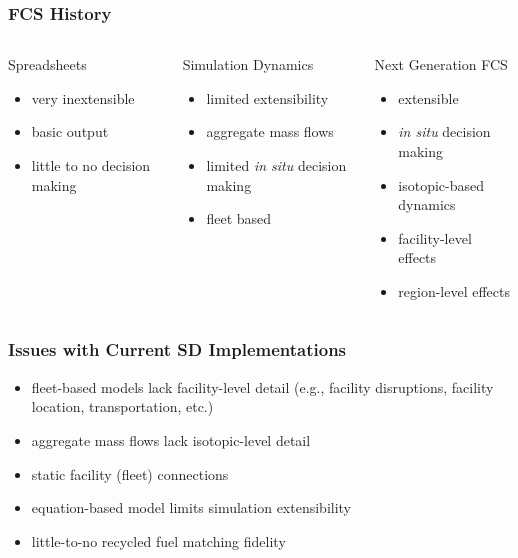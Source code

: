 
\begin{frame}[ctb!]
  \frametitle{FCS History}

  \begin{columns}[t]

    \begin{block}{Spreadsheets}
      \begin{itemize}
        \item very inextensible
        \item basic output
        \item little to no decision making
      \end{itemize}
    \end{block}

    \pause

    \begin{block}{Simulation Dynamics}
      \begin{itemize}
        \item limited extensibility
        \item aggregate mass flows
        \item limited \textit{in situ} decision making
        \item fleet based
      \end{itemize}
    \end{block}

    \pause

    \begin{block}{Next Generation FCS}
      \begin{itemize}
        \item extensible
        \item \textit{in situ} decision making
        \item isotopic-based dynamics
        \item facility-level effects
        \item region-level effects
      \end{itemize}
    \end{block}

  \end{columns}
  
\end{frame}

\begin{frame}[ctb!]
  \frametitle{Issues with Current SD Implementations}
  
  \begin{itemize}
    \item fleet-based models lack facility-level detail (e.g., facility
      disruptions, facility location, transportation, etc.)
    \item aggregate mass flows lack isotopic-level detail
    \item static facility (fleet) connections
    \item equation-based model limits simulation extensibility
    \item little-to-no recycled fuel matching fidelity
  \end{itemize}

\end{frame}

